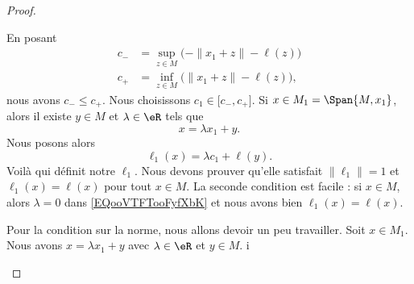 \begin{proof}
\begin{subproof}
        En posant
        \begin{subequations}
            \begin{align}
                c_- & =\sup_{z\in M}\big( -\| x_1+z \|-\ell(z) \big)  \\
                c_+ & =\inf_{z\in M}\big(  \| x_1+z \|-\ell(z) \big),
            \end{align}
        \end{subequations}
        nous avons \( c_-\leq c_+\). Nous choisissons \( c_1\in \mathopen[ c_- , c_+ \mathclose]\).
        \spitem[La définition]
        Si \( x\in M_1=\Span{M,x_1}\), alors il existe \( y\in M\) et \( \lambda\in \eR\) tels que
        \begin{equation}
            x=\lambda x_1+y.
        \end{equation}
        Nous posons alors
        \begin{equation}        \label{EQooVTFTooFyfXbK}
            \ell_1(x)=\lambda c_1+\ell(y).
        \end{equation}
        Voilà qui définit notre \( \ell_1\). Nous devons prouver qu'elle satisfait \( \| \ell_1 \|=1\) et \( \ell_1(x)=\ell(x)\) pour tout \( x\in M\). La seconde condition est facile : si \( x\in M\), alors \( \lambda=0\) dans \eqref{EQooVTFTooFyfXbK} et nous avons bien \( \ell_1(x)=\ell(x)\).

        Pour la condition sur la norme, nous allons devoir un peu travailler.
        Soit \( x\in M_1\). Nous avons \( x=\lambda x_1+y\) avec \( \lambda\in \eR\) et \( y\in M\). i


\end{subproof}
\end{proof}
